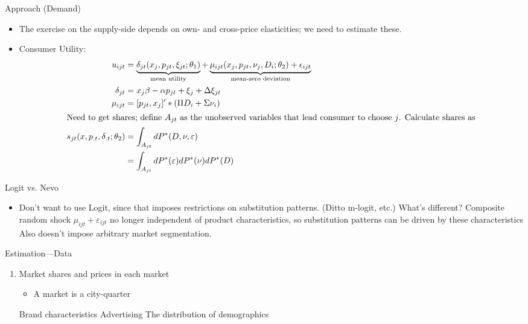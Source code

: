 \documentclass[dvipsnames]{beamer}
\begin{document}
 \begin{frame}{Approach (Demand)}
   \begin{itemize}
   \item The exercise on the supply-side depends on own- and cross-price elasticities; we need to estimate these.
   \item Consumer Utility:
     \begin{align*}
       u_{ijt} &= \underbrace{\delta_{jt}(x_j, p_{jt}, \xi_{jt}; \theta_1)}_{\text{mean utility}} + \underbrace{\mu_{ijt}(x_j, p_{jt}, \nu_j, D_i; \theta_2) + \epsilon_{ijt}}_{\text{mean-zero deviation}} \\
       \delta_{jt} &= x_j \beta - \alpha p_{jt} + \xi_{j} +\Delta \xi_{jt}\\
       \mu_{ijt} &= [p_{jt}, x_j]^\prime \ast (\Pi D_i + \Sigma \nu_i)\\
       \intertext{Need to get shares; define $A_{jt}$ as the  unobserved variables that lead consumer to choose $j$. Calculate shares as}
       s_{jt}(x, p_{.t}, \delta_{.t}; \theta_2) &= \int_{A_{jt}} dP^\ast (D, \nu, \varepsilon)\\
       &= \int_{A_{jt}} dP^\ast(\varepsilon) dP^\ast(\nu)dP^\ast(D)
     \end{align*}
   \end{itemize}
 \end{frame}
 \begin{frame}{Logit vs. Nevo}
   \begin{itemize}
   \item Don't want to use Logit, since that imposes restrictions on substitution patterns. (Ditto m-logit, etc.)
     \vitem What's different? Composite random shock $\mu_{ijt} + \varepsilon_{ijt}$ no longer independent of product characteristics, so substitution patterns can be driven by these characteristics
     \vitem Also doesn't impose arbitrary market segmentation.
   \end{itemize}
 \end{frame}
 \begin{frame}{Estimation---Data}
   \begin{enumerate}
   \item Market shares and prices in each market
     \begin{itemize}
     \item A market is a city-quarter
     \end{itemize}
     \vitem Brand characteristics
     \vitem Advertising
     \vitem The distribution of demographics
   \end{enumerate}
 \end{frame}
\end{document}
